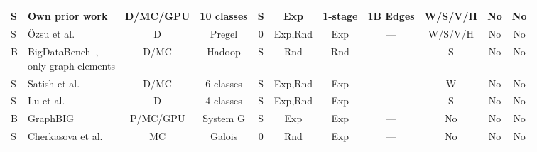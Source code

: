 \begin{tabular}[!tb]{|l|l|l|l|l|l|l|l|l|l|l|}
\hline
\hline
S & {\bf Own prior work}~\cite{DBLP:conf/ipps/GuoBVIMW14,DBLP:conf/ccgrid/GuoVIE15,DBLP:conf/sigmod/CapotaHIPEB14} & \multicolumn{1}{c|}{{\bf D/MC/GPU}} & \multicolumn{1}{c|}{{\bf 10 classes}} & \multicolumn{1}{c|}{{\bf S}} & \multicolumn{1}{c|}{{\bf Exp}} & \multicolumn{1}{c|}{{\bf 1-stage}} & \multicolumn{1}{c|}{{\bf 1B Edges}} & \multicolumn{1}{c|}{{\bf W/S/V/H}} & \multicolumn{1}{c|}{{\bf No}} & \multicolumn{1}{c|}{{\bf No}}\\ 
\hline
\hline
S & \"Ozsu et al.~\cite{DBLP:journals/pvldb/HanDAOWJ14} & \multicolumn{1}{c|}{D} & \multicolumn{1}{c|}{Pregel} & \multicolumn{1}{c|}{0} & \multicolumn{1}{c|}{Exp,Rnd} & \multicolumn{1}{c|}{Exp} & \multicolumn{1}{c|}{---} & \multicolumn{1}{c|}{W/S/V/H} & \multicolumn{1}{c|}{No} & \multicolumn{1}{c|}{No} \\ 
\hline
B & \pbox{5cm}{BigDataBench~\cite{DBLP:conf/wbdb/MingLGHYWZ13,DBLP:conf/hpca/WangZLZYHGJSZZLZLQ14}, \\only graph elements} & \multicolumn{1}{c|}{D/MC} & \multicolumn{1}{c|}{Hadoop} & \multicolumn{1}{c|}{S} & \multicolumn{1}{c|}{Rnd} & \multicolumn{1}{c|}{Rnd} & \multicolumn{1}{c|}{---} & \multicolumn{1}{c|}{S} & \multicolumn{1}{c|}{No} & \multicolumn{1}{c|}{No} \\ 
\hline
S & Satish et al.~\cite{DBLP:conf/sigmod/SatishSPSPHSYD14} & \multicolumn{1}{c|}{D/MC} & \multicolumn{1}{c|}{6 classes} & \multicolumn{1}{c|}{S} & \multicolumn{1}{c|}{Exp,Rnd} & \multicolumn{1}{c|}{Exp} & \multicolumn{1}{c|}{---} & \multicolumn{1}{c|}{W} & \multicolumn{1}{c|}{No} & \multicolumn{1}{c|}{No}\\ 
\hline
S & Lu et al.~\cite{DBLP:journals/pvldb/LuCYW14} & \multicolumn{1}{c|}{D} & \multicolumn{1}{c|}{4 classes} & \multicolumn{1}{c|}{S} & \multicolumn{1}{c|}{Exp,Rnd} & \multicolumn{1}{c|}{Exp} & \multicolumn{1}{c|}{---} & \multicolumn{1}{c|}{S} & \multicolumn{1}{c|}{No} & \multicolumn{1}{c|}{No} \\ 
\hline
B & GraphBIG~\cite{DBLP:conf/sc/NaiXTKL15} & \multicolumn{1}{c|}{P/MC/GPU} & \multicolumn{1}{c|}{System G} & \multicolumn{1}{c|}{S} & \multicolumn{1}{c|}{Exp} & \multicolumn{1}{c|}{Exp} & \multicolumn{1}{c|}{---} & \multicolumn{1}{c|}{No} & \multicolumn{1}{c|}{No} & \multicolumn{1}{c|}{No} \\ 
\hline
S & Cherkasova et al.~\cite{conf/icpe/EisenmanCMCFK16} & \multicolumn{1}{c|}{MC} & \multicolumn{1}{c|}{Galois} & \multicolumn{1}{c|}{0} & \multicolumn{1}{c|}{Rnd} & \multicolumn{1}{c|}{Exp} & \multicolumn{1}{c|}{---} & \multicolumn{1}{c|}{No} & \multicolumn{1}{c|}{No} & \multicolumn{1}{c|}{No} \\ 

\end{tabular}
